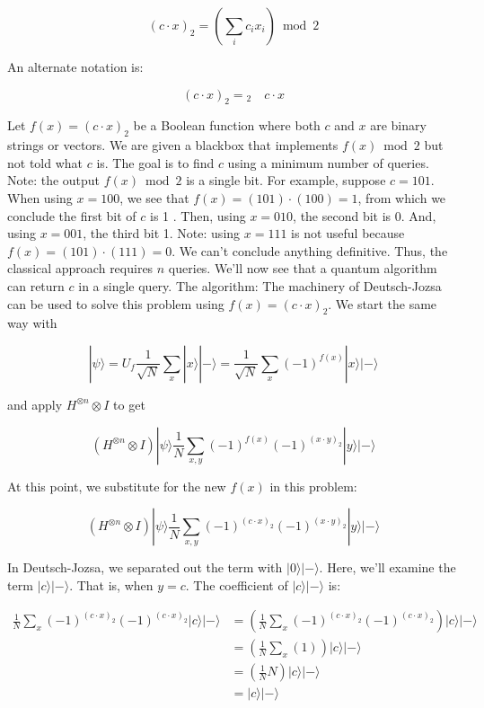 \documentclass[main.tex]{subfiles}
\begin{document}
    $$
    (c \cdot x)_{2}=\left(\sum_{i} c_{i} x_{i}\right) \bmod 2
    $$
    
    An alternate notation is:
    
    $$
    (c \cdot x)_{2}={ }_{2} \quad c \cdot x
    $$
    
    Let $f(x)=(c \cdot x)_{2}$ be a Boolean function where both $c$ and $x$ are binary strings or vectors. We are given a blackbox that implements $f(x) \bmod 2$ but not told what $c$ is. The goal is to find $c$ using a minimum number of queries. Note: the output $f(x) \bmod 2$ is a single bit. For example, suppose $c=101$. When using $x=100$, we see that $f(x)=(101) \cdot(100)=1$, from which we conclude the first bit of $c$ is 1 . Then, using $x=010$, the second bit is 0. And, using $x=001$, the third bit 1. Note: using $x=111$ is not useful because $f(x)=(101) \cdot(111)=0$. We can't conclude anything definitive. Thus, the classical approach requires $n$ queries. We'll now see that a quantum algorithm can return $c$ in a single query. The algorithm: The machinery of Deutsch-Jozsa can be used to solve this problem using $f(x)=(c \cdot x)_{2}$. We start the same way with
    
    $$
    |\psi\rangle=U_{f} \frac{1}{\sqrt{N}} \sum_{x}|x\rangle|-\rangle=\frac{1}{\sqrt{N}} \sum_{x}(-1)^{f(x)}|x\rangle|-\rangle
    $$
    
    and apply $H^{\otimes n} \otimes I$ to get
    
    $$
    \left(H^{\otimes n} \otimes I\right)|\psi\rangle \frac{1}{N} \sum_{x, y}(-1)^{f(x)}(-1)^{(x \cdot y)_{2}}|y\rangle|-\rangle
    $$
    
    At this point, we substitute for the new $f(x)$ in this problem:
    
    $$
    \left(H^{\otimes n} \otimes I\right)|\psi\rangle \frac{1}{N} \sum_{x, y}(-1)^{(c \cdot x)_{2}}(-1)^{(x \cdot y)_{2}}|y\rangle|-\rangle
    $$
    
    In Deutsch-Jozsa, we separated out the term with $|0\rangle|-\rangle$. Here, we'll examine the term $|c\rangle|-\rangle$. That is, when $y=c$. The coefficient of $|c\rangle|-\rangle$ is:
    
    $$
    \begin{aligned}
    \frac{1}{N} \sum_{x}(-1)^{(c \cdot x)_{2}}(-1)^{(c \cdot x)_{2}}|c\rangle|-\rangle &=\left(\frac{1}{N} \sum_{x}(-1)^{(c \cdot x)_{2}}(-1)^{(c \cdot x)_{2}}\right)|c\rangle|-\rangle \\
    &=\left(\frac{1}{N} \sum_{x}(1)\right)|c\rangle|-\rangle \\
    &=\left(\frac{1}{N} N\right)|c\rangle|-\rangle \\
    &=|c\rangle|-\rangle
    \end{aligned}
    $$
    
\end{document}
